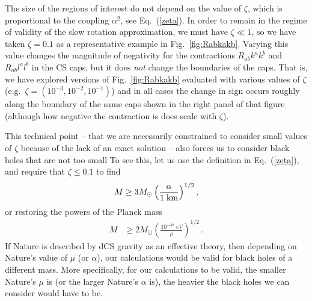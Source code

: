 \documentclass[prd,twocolumn,showpacs,superscriptaddress,nofootinbib]{revtex4-2}
\newcommand\be{\begin{equation}}
\newcommand\ee{\end{equation}}
\newcommand{\ny}[1]{{\textcolor{red}{{[NY: {#1}]}} }}
\begin{document}
The size of the regions of interest do not depend on the value of $\zeta$, which is proportional to the coupling $\alpha^2$, see Eq.~(\ref{zeta}). In order to remain in the regime of validity of the slow rotation approximation, we must have $\zeta \ll 1$, so we have taken $\zeta = 0.1$ as a representative example in Fig.~\ref{fig:Rabkakb}. Varying this value changes the magnitude of negativity for the contractions $R_{ab}k^ak^b$ and $R_{ab}l^al^b$ in the CS caps, but it does \textit{not} change the boundaries of the caps. That is, we have explored versions of Fig.~\ref{fig:Rabkakb} evaluated with various values of $\zeta$ (e.g.~$\zeta = (10^{-3},10^{-2},10^{-1})$) and in all cases the change in sign occurs roughly along the boundary of the same caps shown in the right panel of that figure (although how negative the contraction is does scale with $\zeta$).

This technical point -- that we are necessarily constrained to consider small values of $\zeta$ because 
of the lack of an exact solution --  also forces us to consider black holes that are not too small %
To see this, let us use the definition in Eq.~(\ref{zeta}), and require that $\zeta \leq 0.1$ to find %
\be
M \geq 3 M_\odot  \left(\frac{\alpha}{1 \; {\rm{km}}}\right)^{1/2} , 
\ee
or restoring the  powers of the Planck mass
\begin{align}
M &\geq  2 M_{\odot} \left(\frac{10^{-47} \; eV}{\mu}\right)^{1/2}\,.
\label{M-zeta}
\end{align}
If Nature is described by dCS gravity as an effective theory, then depending on Nature's value of $\mu$ (or $\alpha$), our calculations would be valid for black holes of a different mass. More specifically, for our calculations to be valid, the smaller Nature's $\mu$ is (or the larger Nature's $\alpha$ is), the heavier the black holes we can consider would have to be.
\end{document}
